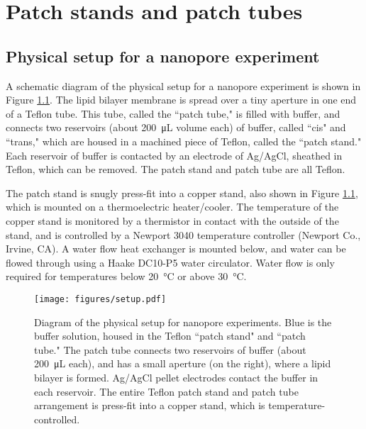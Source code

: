 \chapter{Patch stands and patch tubes}
\label{patch_stands_tubes}

\section{Physical setup for a nanopore experiment}

A schematic diagram of the physical setup for a nanopore experiment is shown in Figure \ref{fig:physical_setup}.  The lipid bilayer membrane is spread over a tiny aperture in one end of a Teflon tube.  This tube, called the ``patch tube," is filled with buffer, and connects two reservoirs (about \SI{200}{\uL} volume each) of buffer, called ``cis" and ``trans," which are housed in a machined piece of Teflon, called the ``patch stand."  Each reservoir of buffer is contacted by an electrode of Ag/AgCl, sheathed in Teflon, which can be removed.  The patch stand and patch tube are all Teflon.

The patch stand is snugly press-fit into a copper stand, also shown in Figure \ref{fig:physical_setup}, which is mounted on a thermoelectric heater/cooler.  The temperature of the copper stand is monitored by a thermistor in contact with the outside of the stand, and is controlled by a Newport 3040 temperature controller (Newport Co., Irvine, CA).  A water flow heat exchanger is mounted below, and water can be flowed through using a Haake DC10-P5 water circulator.  Water flow is only required for temperatures below \SI{20}{\celsius} or above \SI{30}{\celsius}.

\begin{figure}[h]
\begin{centering}
\texttt{[image: figures/setup.pdf]}
\caption[Diagram of physical experimental setup]{Diagram of the physical setup for nanopore experiments.  Blue is the buffer solution, housed in the Teflon ``patch stand" and ``patch tube."  The patch tube connects two reservoirs of buffer (about \SI{200}{\uL} each), and has a small aperture (on the right), where a lipid bilayer is formed.  Ag/AgCl pellet electrodes contact the buffer in each reservoir.  The entire Teflon patch stand and patch tube arrangement is press-fit into a copper stand, which is temperature-controlled.}
\label{fig:physical_setup}
\end{centering}
\end{figure}


